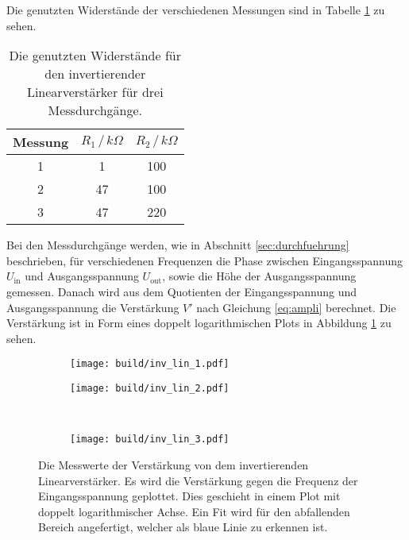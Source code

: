 Die genutzten Widerstände der verschiedenen Messungen sind in Tabelle \ref{tab:wider_inv_lin} zu sehen.
\begin{table}[H]
    \centering
    \begin{tabular}{ccc}
        \toprule
        Messung & $R_1 \, / \, k\Omega $ & $R_2 \, / \,  k\Omega $ \\
        \midrule 
        1 & 1 & 100 \\
        2 & 47 & 100 \\
        3 & 47 & 220 \\
        \bottomrule
    \end{tabular}
    \caption{Die genutzten Widerstände für den invertierender Linearverstärker für drei Messdurchgänge.}
    \label{tab:wider_inv_lin}
\end{table}
Bei den Messdurchgänge werden, wie in Abschnitt \ref{sec:durchfuehrung} beschrieben, für verschiedenen Frequenzen die Phase zwischen Eingangsspannung $U_\text{in}$ und Ausgangsspannung $U_\text{out}$, sowie die Höhe der Ausgangsspannung gemessen.
Danach wird aus dem Quotienten der Eingangsspannung und Ausgangsspannung die Verstärkung $V'$ nach Gleichung \ref{eq:ampli} berechnet.
Die Verstärkung ist in Form eines doppelt logarithmischen Plots in Abbildung \ref{fig:inv_lin} zu sehen.
\begin{figure}[H]
    \centering
    \begin{subfigure}{0.49\linewidth}%
        \texttt{[image: build/inv\_lin\_1.pdf]}
    \end{subfigure}
    \hfill
    \begin{subfigure}{0.49\linewidth}%
        \texttt{[image: build/inv\_lin\_2.pdf]}
    \end{subfigure}\\
    \begin{subfigure}{0.49\linewidth}%
        \texttt{[image: build/inv\_lin\_3.pdf]}
    \end{subfigure}
    \caption{Die Messwerte der Verstärkung von dem invertierenden Linearverstärker. Es wird die Verstärkung gegen die Frequenz der Eingangsspannung geplottet.
    Dies geschieht in einem Plot mit doppelt logarithmischer Achse. Ein Fit wird für den abfallenden Bereich angefertigt, welcher als blaue Linie zu erkennen ist.}
    \label{fig:inv_lin}
\end{figure}
